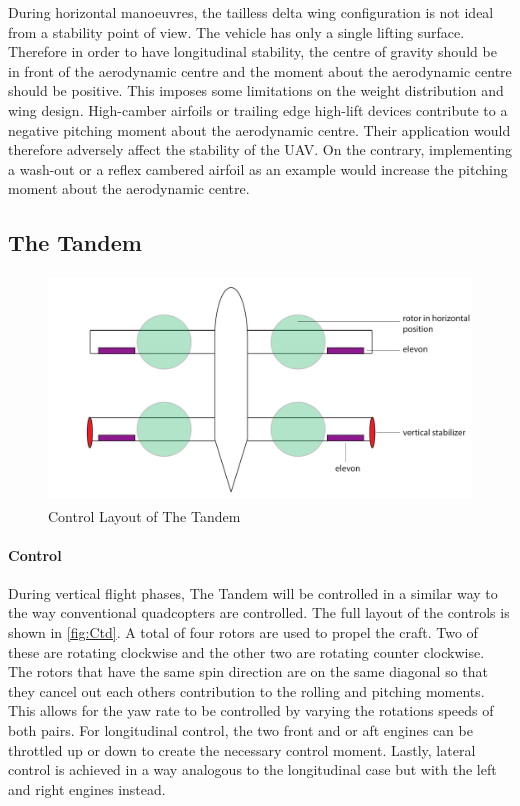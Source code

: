 During horizontal manoeuvres, the tailless delta wing configuration is not ideal from a stability point of view. The vehicle has only a single lifting surface. Therefore in order to have longitudinal stability, the centre of gravity should be in front of the aerodynamic centre and the moment about the aerodynamic centre should be positive. This imposes some limitations on the weight distribution and wing design. High-camber airfoils or trailing edge high-lift devices contribute to a negative pitching moment about the aerodynamic centre. Their application would therefore adversely affect the stability of the UAV. On the contrary, implementing a wash-out or a reflex cambered airfoil as an example would increase the pitching moment about the aerodynamic centre.

\subsection{The Tandem}
\begin{figure}[htb]
    \centering
    \includegraphics[height=6cm]{Stability/Figures/concept_2.pdf}
    \caption{Control Layout of The Tandem}
    \label{fig:Ctd}
\end{figure}

\paragraph{Control}
During vertical flight phases, The Tandem will be controlled in a similar way to the way conventional quadcopters are controlled. The full layout of the controls is shown in \autoref{fig:Ctd}. A total of four rotors are used to propel the craft. Two of these are rotating clockwise and the other two are rotating counter clockwise. The rotors that have the same spin direction are on the same diagonal so that they cancel out each others contribution to the rolling and pitching moments. This allows for the yaw rate to be controlled by varying the rotations speeds of both pairs. For longitudinal control, the two front and or aft engines can be throttled up or down to create the necessary control moment. Lastly, lateral control is achieved in a way analogous to the longitudinal case but with the left and right engines instead.

